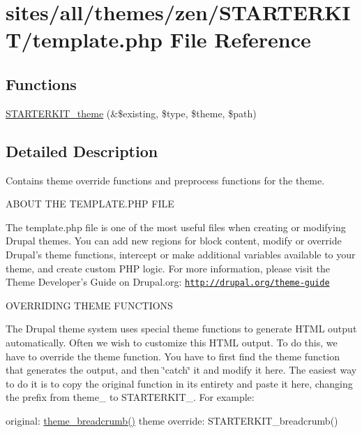 \hypertarget{sites_2all_2themes_2zen_2STARTERKIT_2template_8php}{
\section{sites/all/themes/zen/STARTERKIT/template.php File Reference}
\label{sites_2all_2themes_2zen_2STARTERKIT_2template_8php}
}
\subsection*{Functions}
\begin{CompactItemize}
\item 
\hyperlink{sites_2all_2themes_2zen_2STARTERKIT_2template_8php_dd812d94a6ad6fa46e1ce89deac24684}{STARTERKIT\_\-theme} (\&\$existing, \$type, \$theme, \$path)
\end{CompactItemize}


\subsection{Detailed Description}
Contains theme override functions and preprocess functions for the theme.

ABOUT THE TEMPLATE.PHP FILE

The template.php file is one of the most useful files when creating or modifying Drupal themes. You can add new regions for block content, modify or override Drupal's theme functions, intercept or make additional variables available to your theme, and create custom PHP logic. For more information, please visit the Theme Developer's Guide on Drupal.org: \href{http://drupal.org/theme-guide}{\tt http://drupal.org/theme-guide}

OVERRIDING THEME FUNCTIONS

The Drupal theme system uses special theme functions to generate HTML output automatically. Often we wish to customize this HTML output. To do this, we have to override the theme function. You have to first find the theme function that generates the output, and then \char`\"{}catch\char`\"{} it and modify it here. The easiest way to do it is to copy the original function in its entirety and paste it here, changing the prefix from theme\_\- to STARTERKIT\_\-. For example:

original: \hyperlink{group__themeable_g499898a137ccb56620058a9ad884363a}{theme\_\-breadcrumb()} theme override: STARTERKIT\_\-breadcrumb()

